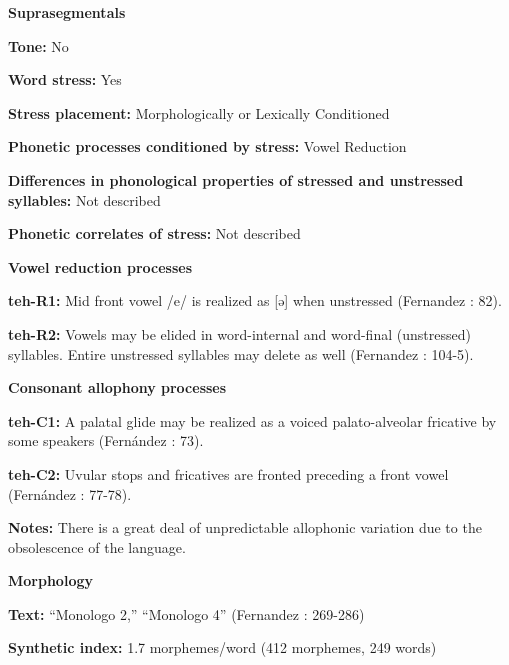 \textbf{Suprasegmentals}



\textbf{Tone:} No



\textbf{Word stress:} Yes



\textbf{Stress placement:} Morphologically or Lexically Conditioned



\textbf{Phonetic processes conditioned by stress:} Vowel Reduction



\textbf{Differences in phonological properties of stressed and unstressed syllables:} Not described



\textbf{Phonetic correlates of stress:} Not described



\textbf{Vowel reduction processes}



\textbf{teh-R1:} Mid front vowel /e/ is realized as [ə] when unstressed (Fernandez \citealt{Garay1998}: 82).



\textbf{teh-R2:} Vowels may be elided in word-internal and word-final (unstressed) syllables. Entire unstressed syllables may delete as well (Fernandez \citealt{Garay1998}: 104-5).



\textbf{Consonant allophony processes}



\textbf{teh-C1:} A palatal glide may be realized as a voiced palato-alveolar fricative by some speakers (Fernández \citealt{Garay1998}: 73).



\textbf{teh-C2:} Uvular stops and fricatives are fronted preceding a front vowel (Fernández \citealt{Garay1998}: 77-78).



\textbf{Notes:} There is a great deal of unpredictable allophonic variation due to the obsolescence of the language.



\textbf{Morphology}



\textbf{Text:} “Monologo 2,” “Monologo 4” (Fernandez \citealt{GarayHernandez2006}: 269-286)



\textbf{Synthetic index:} 1.7 morphemes/word (412 morphemes, 249 words)



